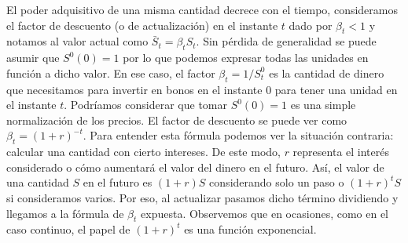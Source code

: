 El poder adquisitivo de una misma cantidad decrece con el tiempo, consideramos el factor de descuento (o de actualización) en el instante $ t $ dado por $ \beta_t < 1 $ y notamos al valor actual como $ \bar{S}_t = \beta_t S_t $. Sin pérdida de generalidad se puede asumir que $ S^0(0) = 1 $ por lo que podemos expresar todas las unidades en función a dicho valor. En ese caso, el factor $ \beta_t = 1/S^0_t $ es la cantidad de dinero que necesitamos para invertir en bonos en el instante 0 para tener una unidad en el instante $ t $. Podríamos considerar que tomar $ S^0(0) = 1 $  es una simple normalización de los precios. El factor de descuento se puede ver como $ \beta_t = (1+r)^{-t} $. Para entender esta fórmula podemos ver la situación contraria: calcular una cantidad con cierto intereses. De este modo, $ r $ representa el interés considerado o cómo aumentará el valor del dinero en el futuro. Así, el valor de una cantidad $ S $ en el futuro es $ (1+r)S $ considerando solo un paso o $ (1+r)^t S $ si consideramos varios. Por eso, al actualizar pasamos dicho término dividiendo y llegamos a la fórmula de $ \beta_t $ expuesta. Observemos que en ocasiones, como en el caso continuo, el papel de $ (1+r)^t $ es una función exponencial.\\

